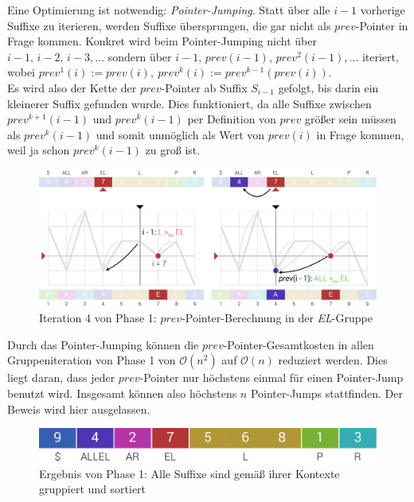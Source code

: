 \documentclass[twoside,11pt]{article}
\theoremstyle{break}
\begin{document}
Eine Optimierung ist notwendig: \textit{Pointer-Jumping}. Statt über alle $i - 1$ vorherige Suffixe zu iterieren, werden Suffixe übersprungen, die gar nicht als $prev$-Pointer in Frage kommen. Konkret wird beim Pointer-Jumping nicht über $i - 1,\, i - 2,\, i - 3, \dots$ sondern über $i - 1,\, prev(i - 1),\, prev^2(i - 1), \dots$ iteriert, wobei $prev^1(i) := prev(i),\ prev^k(i) := prev^{k - 1}(prev(i))$.\\

Es wird also der Kette der $prev$-Pointer ab Suffix $S_{i - 1}$ gefolgt, bis darin ein kleinerer Suffix gefunden wurde. Dies funktioniert, da alle Suffixe zwischen $prev^{k + 1}(i - 1)$ und $prev^k(i - 1)$ per Definition von $prev$ größer sein müssen als $prev^k(i - 1)$ und somit unmöglich als Wert von $prev(i)$ in Frage kommen, weil ja schon $prev^k(i - 1)$ zu groß ist.

\begin{figure}[h]
	\centering
	\includegraphics[width=\linewidth,bb=0 0 1310 534]{./assets/phase1-EL.pdf}
	\caption{Iteration 4 von Phase 1: $prev$-Pointer-Berechnung in der \textit{EL}-Gruppe}
\label{fig:phase1-EL}
\end{figure}

Durch das Pointer-Jumping können die $prev$-Pointer-Gesamtkosten in allen Gruppeniteration von Phase 1 von $\mathcal{O}(n^2)$ auf $\mathcal{O}(n)$ reduziert werden. Dies liegt daran, dass jeder $prev$-Pointer nur höchstens einmal für einen Pointer-Jump benutzt wird. Insgesamt können also höchstens $n$ Pointer-Jumps stattfinden. Der Beweis wird hier ausgelassen.
\begin{figure}[h]
	\centering
	\includegraphics[width=0.5\linewidth,bb=0 0 640 67]{./assets/phase1Result.pdf}
	\caption{Ergebnis von Phase 1: Alle Suffixe sind gemäß ihrer Kontexte gruppiert und sortiert}
\label{fig:phase1Result}
\end{figure}
\end{document}
